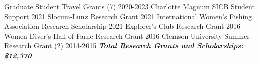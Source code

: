 \begin{cvtable}
        {Graduate Student Travel Grants (7)}
        {2020-2023}
        {}
        {Charlotte Magnum SICB Student Support}
        {2021}
        {}
        {Slocum-Lunz Research Grant}
        {2021}
        {}
        {International Women's Fishing Association Research Scholarship}
        {2021}
        {}
        {Explorer's Club Research Grant}
        {2016}
        {}
        {Women Diver's Hall of Fame Research Grant}
        {2016}
        {}
        {Clemson University Summer Research Grant (2)}
        {2014-2015}
        {}
    \cvitem{}
        {\emph{\textbf{Total Research Grants and Scholarships: \$12,370}}}
        {}
        {}
\end{cvtable}